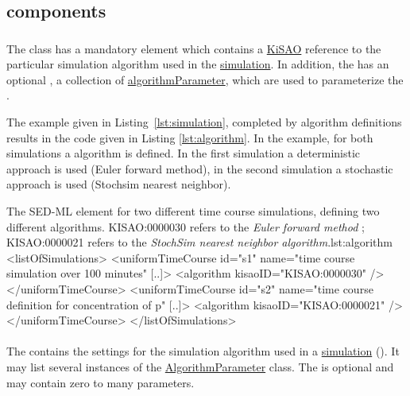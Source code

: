 \subsection{ components}
\label{class:simulationComponents}

\subsubsection{}
\label{class:algorithm}
The  class has a mandatory element \hyperref[sec:kisaoid]{} which contains a \hyperref[sec:kisao]{KiSAO} reference to the particular simulation algorithm used in the \hyperref[class:simulation]{simulation}. In addition, the  has an optional \hyperref[class:listOfAlgorithmParameters]{}, a collection of \hyperref[class:algorithmParameter]{algorithmParameter}, which are used to parameterize the .

The example given in Listing~\ref{lst:simulation}, completed by algorithm definitions results in the code given in Listing \ref{lst:algorithm}. In the example, for both simulations a algorithm is defined. In the first simulation  a deterministic approach is used (Euler forward method), in the second simulation  a stochastic approach is used (Stochsim nearest neighbor).

\begin{myXmlLst}{The SED-ML  element for two different time course simulations, defining two different algorithms. KISAO:0000030 refers to the \emph{Euler forward method} ; KISAO:0000021 refers to the \emph{StochSim nearest neighbor algorithm}.}{lst:algorithm}
<listOfSimulations>
	<uniformTimeCourse id="s1" name="time course simulation over 100 minutes" [..]>
		<algorithm kisaoID="KISAO:0000030" />
	</uniformTimeCourse>
	<uniformTimeCourse id="s2" name="time course definition for concentration of p" [..]>
		<algorithm kisaoID="KISAO:0000021" />
	</uniformTimeCourse>
</listOfSimulations>
\end{myXmlLst}


\paragraph*{}
\label{class:listOfAlgorithmParameters}
The  contains the settings for the simulation algorithm used in a \hyperref[class:simulation]{simulation} (). It may list several instances of the \hyperref[class:algorithmParameter]{AlgorithmParameter} class. The  is optional and may contain zero to many parameters.


